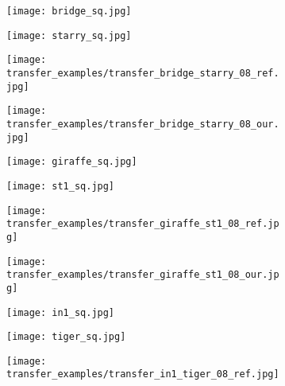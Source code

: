 \begin{figure}[H]
	\centering
	\begin{subfigure}[b]{0.225\linewidth}
		\texttt{[image: bridge\_sq.jpg]} %
	\end{subfigure}
	\begin{subfigure}[b]{0.225\linewidth}
		\texttt{[image: starry\_sq.jpg]} %
	\end{subfigure}
	\begin{subfigure}[b]{0.225\linewidth}
		\texttt{[image: transfer\_examples/transfer\_bridge\_starry\_08\_ref.jpg]} %
	\end{subfigure}
	\begin{subfigure}[b]{0.225\linewidth}
		\texttt{[image: transfer\_examples/transfer\_bridge\_starry\_08\_our.jpg]} %
	\end{subfigure}
	\centering
	\begin{subfigure}[b]{0.225\linewidth}
		\texttt{[image: giraffe\_sq.jpg]} %
	\end{subfigure}
	\begin{subfigure}[b]{0.225\linewidth}
		\texttt{[image: st1\_sq.jpg]} %
	\end{subfigure}
	\begin{subfigure}[b]{0.225\linewidth}
		\texttt{[image: transfer\_examples/transfer\_giraffe\_st1\_08\_ref.jpg]} %
	\end{subfigure}
	\begin{subfigure}[b]{0.225\linewidth}
		\texttt{[image: transfer\_examples/transfer\_giraffe\_st1\_08\_our.jpg]} %
	\end{subfigure}
	\centering
	\begin{subfigure}[b]{0.225\linewidth}
		\texttt{[image: in1\_sq.jpg]} %
	\end{subfigure}
	\begin{subfigure}[b]{0.225\linewidth}
		\texttt{[image: tiger\_sq.jpg]} %
	\end{subfigure}
	\begin{subfigure}[b]{0.225\linewidth}
		\texttt{[image: transfer\_examples/transfer\_in1\_tiger\_08\_ref.jpg]} %
	\end{subfigure}

\end{figure}
